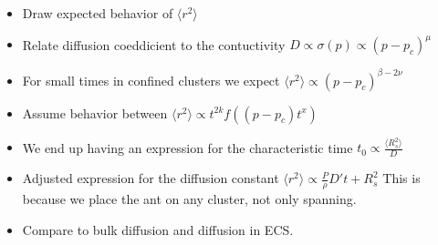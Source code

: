 \documentclass[a4paper,english, 10pt, twoside]{article}
\begin{document}
\begin{itemize}
 \item Draw expected behavior of $\langle r^2\rangle$
 \item Relate diffusion coeddicient to the contuctivity $D\propto \sigma(p) \propto (p-p_c)^\mu$
 \item For small times in confined clusters we expect $\langle r^2\rangle \propto (p-p_c)^{\beta-2\nu}$
 \item Assume behavior between $\langle r^2\rangle\propto t^{2k}f((p-p_c)t^x)$
 \item We end up having an expression for the characteristic time $t_0 \propto \frac{\langle R_s^2\rangle}
 {D}$
 \item Adjusted expression for the diffusion constant $\langle r^2\rangle \propto \frac{P}{\rho}D't +R_s^2$ 
 This is because we place the ant on any cluster, not only spanning.
 \item Compare to bulk diffusion and diffusion in ECS.
\end{itemize}
\end{document}
